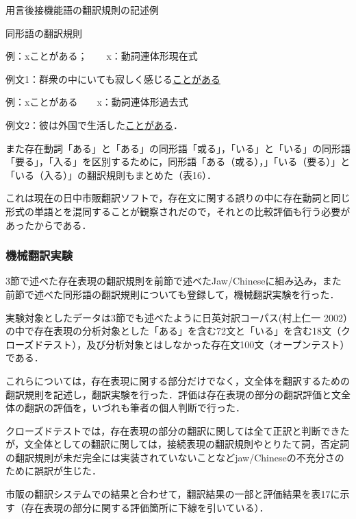 \documentclass[japanese]{jnlp_1.4}
\begin{document}
\begin{table}[b]
\vspace{-0.5\baselineskip}
\caption{用言後接機能語の翻訳規則の記述例}

\end{table}
\begin{table}[b]
\caption{同形語の翻訳規則}

\end{table}




例：xことがある；　　x：動詞連体形現在式

例文1：群衆の中にいても寂しく感じる\ul{ことがある}

例：xことがある　　x：動詞連体形過去式

例文2：彼は外国で生活した\ul{ことがある}．

また存在動詞「ある」と「ある」の同形語「或る」，「いる」と「いる」の同形語「要る」，「入る」を区別するために，同形語「ある（或る），」「いる（要る）」と「いる（入る）」の翻訳規則もまとめた（表16）．

これは現在の日中市販翻訳ソフトで，存在文に関する誤りの中に存在動詞と同じ形式の単語とを混同することが観察されだので，それとの比較評価も行う必要があったからである．



\subsubsection{機械翻訳実験}

3節で述べた存在表現の翻訳規則を前節で述べたJaw/Chineseに組み込み，また前節で述べた同形語の翻訳規則についても登録して，機械翻訳実験を行った．

実験対象としたデータは3節でも述べたように日英対訳コーパス(村上仁一 2002）の中で存在表現の分析対象とした「ある」を含む72文と「いる」を含む18文（クローズドテスト），及び分析対象とはしなかった存在文100文（オープンテスト）である．

これらについては，存在表現に関する部分だけでなく，文全体を翻訳するための翻訳規則を記述し，翻訳実験を行った．評価は存在表現の部分の翻訳評価と文全体の翻訳の評価を，いづれも筆者の個人判断で行った．

クローズドテストでは，存在表現の部分の翻訳に関しては全て正訳と判断できたが，文全体としての翻訳に関しては，接続表現の翻訳規則やとりたて詞，否定詞の翻訳規則が未だ完全には実装されていないことなどjaw/Chineseの不充分さのために誤訳が生じた．

市販の翻訳システムでの結果と合わせて，翻訳結果の一部と評価結果を表17に示す（存在表現の部分に関する評価箇所に下線を引いている）．
\end{document}
